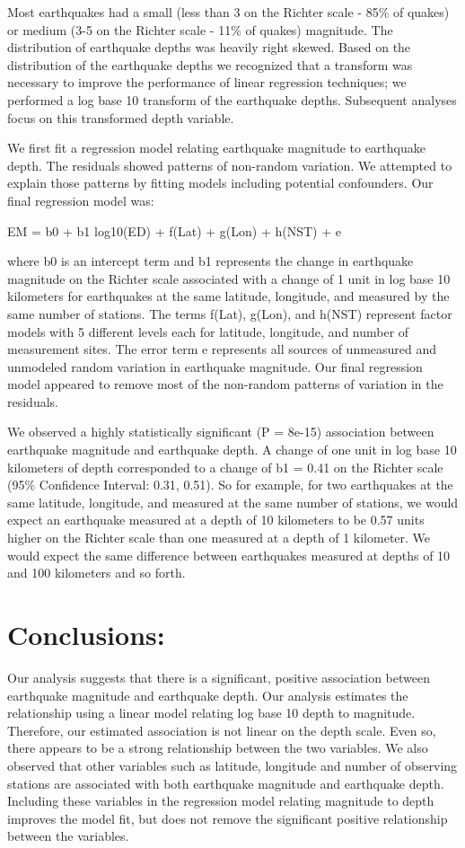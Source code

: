 \documentclass[a4paper,14pt]{extarticle}
\begin{document}
Most earthquakes had a small (less than 3 on the Richter scale - 85\% of quakes) or medium (3-5 on the Richter scale - 11\% of quakes) magnitude. The distribution of earthquake depths was heavily right skewed. Based on the distribution of the earthquake depths we recognized that a transform was necessary to improve the performance of linear regression techniques; we performed a log base 10 transform of the earthquake depths. Subsequent analyses focus on this transformed depth variable.

We first fit a regression model relating earthquake magnitude to earthquake depth. The residuals showed patterns of non-random variation. We attempted to explain those patterns by fitting models including potential confounders. Our final regression model was:

EM  = b0 + b1 log10(ED) + f(Lat) + g(Lon) + h(NST) + e

where b0 is an intercept term and b1 represents the change in earthquake magnitude on the Richter scale associated with a change of 1 unit in log base 10 kilometers for earthquakes at the same latitude, longitude, and measured by the same number of stations. The terms f(Lat), g(Lon), and h(NST) represent factor models with 5 different levels each for latitude, longitude, and number of measurement sites. The error term e represents all sources of unmeasured and unmodeled random variation in earthquake magnitude. Our final regression model appeared to remove most of the non-random patterns of variation in the residuals.

We observed a highly statistically significant (P = 8e-15) association between earthquake magnitude and earthquake depth. A change of one unit in log base 10 kilometers of depth corresponded to a change of b1 = 0.41 on the Richter scale (95\% Confidence Interval: 0.31, 0.51). So for example, for two earthquakes at the same latitude, longitude, and measured at the same number of stations, we would expect an earthquake measured at a depth of 10 kilometers to be 0.57 units higher on the Richter scale than one measured at a depth of 1 kilometer. We would expect the same difference between earthquakes measured at depths of 10 and 100 kilometers and so forth.


\section{Conclusions:}

Our analysis suggests that there is a significant, positive association between earthquake magnitude and earthquake depth. Our analysis estimates the relationship using a linear model relating log base 10 depth to magnitude. Therefore, our estimated association is not linear on the depth scale. Even so, there appears to be a strong relationship between the two variables. We also observed that other variables such as latitude, longitude and number of observing stations are associated with both earthquake magnitude and earthquake depth. Including these variables in the regression model relating magnitude to depth improves the model fit, but does not remove the significant positive relationship between the variables.
\end{document}
